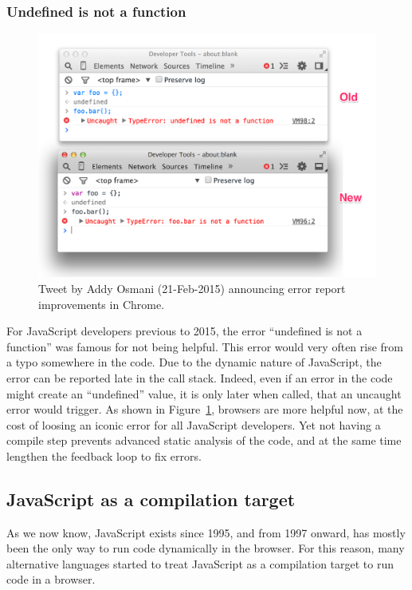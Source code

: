 \subsubsection{Undefined is not a function}%
\label{ssub:undefined_is_not_a_function}

\begin{figure}[ht]
	\centering
	\includegraphics[width=1.0\linewidth]{assets/img/undefined-improved.png}
	\caption{Tweet by Addy Osmani (21-Feb-2015) announcing error report improvements in Chrome.}%
	\label{fig:undefined-improved}
\end{figure}

For JavaScript developers previous to 2015,
the error ``undefined is not a function'' was famous for not being helpful.
This error would very often rise from a typo somewhere in the code.
Due to the dynamic nature of JavaScript, the error can be reported late in the call stack.
Indeed, even if an error in the code might create an ``undefined'' value,
it is only later when called, that an uncaught error would trigger.
As shown in Figure~\ref{fig:undefined-improved}, browsers are more helpful now,
at the cost of loosing an iconic error for all JavaScript developers.
Yet not having a compile step prevents advanced static analysis of the code,
and at the same time lengthen the feedback loop to fix errors.


\subsection{JavaScript as a compilation target}%
\label{sub:javascript_as_a_compilation_target}

As we now know, JavaScript exists since 1995, and from 1997 onward,
has mostly been the only way to run code dynamically in the browser.
For this reason, many alternative languages started to treat JavaScript
as a compilation target to run code in a browser.

